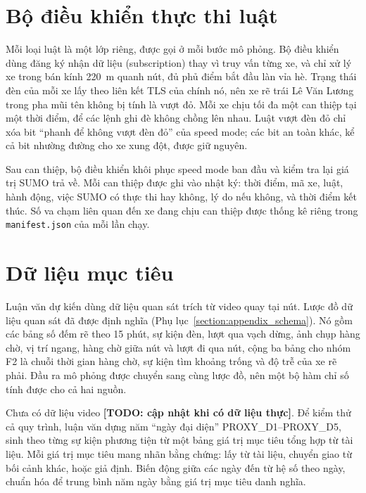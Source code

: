 \documentclass[../main.tex]{subfiles}
\begin{document}
\section{Bộ điều khiển thực thi luật}
\label{section:3.5}

Mỗi loại luật là một lớp riêng, được gọi ở mỗi bước mô phỏng. Bộ điều khiển dùng đăng ký nhận dữ liệu (subscription) thay vì truy vấn từng xe, và chỉ xử lý xe trong bán kính 220~m quanh nút, đủ phủ điểm bắt đầu làn vỉa hè. Trạng thái đèn của mỗi xe lấy theo liên kết TLS của chính nó, nên xe rẽ trái Lê Văn Lương trong pha mũi tên không bị tính là vượt đỏ. Mỗi xe chịu tối đa một can thiệp tại một thời điểm, để các lệnh ghi đè không chồng lên nhau. Luật vượt đèn đỏ chỉ xóa bit ``phanh để không vượt đèn đỏ'' của speed mode; các bit an toàn khác, kể cả bit nhường đường cho xe xung đột, được giữ nguyên.

Sau can thiệp, bộ điều khiển khôi phục speed mode ban đầu và kiểm tra lại giá trị SUMO trả về. Mỗi can thiệp được ghi vào nhật ký: thời điểm, mã xe, luật, hành động, việc SUMO có thực thi hay không, lý do nếu không, và thời điểm kết thúc. Số va chạm liên quan đến xe đang chịu can thiệp được thống kê riêng trong \texttt{manifest.json} của mỗi lần chạy.

\section{Dữ liệu mục tiêu}
\label{section:3.6}

Luận văn dự kiến dùng dữ liệu quan sát trích từ video quay tại nút. Lược đồ dữ liệu quan sát đã được định nghĩa (Phụ lục~\ref{section:appendix_schema}). Nó gồm các bảng số đếm rẽ theo 15 phút, sự kiện đèn, lượt qua vạch dừng, ảnh chụp hàng chờ, vị trí ngang, hàng chờ giữa nút và lượt đi qua nút, cộng ba bảng cho nhóm F2 là chuỗi thời gian hàng chờ, sự kiện tìm khoảng trống và độ trễ của xe rẽ phải. Đầu ra mô phỏng được chuyển sang cùng lược đồ, nên một bộ hàm chỉ số tính được cho cả hai nguồn.

\begin{sloppypar}
Chưa có dữ liệu video \textbf{[TODO: cập nhật khi có dữ liệu thực]}. Để kiểm thử cả quy trình, luận văn dựng năm ``ngày đại diện'' PROXY\_D1--PROXY\_D5, sinh theo từng sự kiện phương tiện từ một bảng giá trị mục tiêu tổng hợp từ tài liệu. Mỗi giá trị mục tiêu mang nhãn bằng chứng: lấy từ tài liệu, chuyển giao từ bối cảnh khác, hoặc giả định. Biến động giữa các ngày đến từ hệ số theo ngày, chuẩn hóa để trung bình năm ngày bằng giá trị mục tiêu danh nghĩa.
\end{sloppypar}
\end{document}
